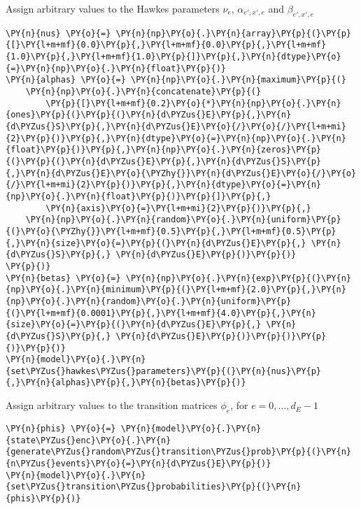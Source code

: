 \documentclass[10pt, article,table]{article}
\begin{document}
    Assign arbitrary values to the Hawkes parameters \(\nu_{e}\),
\(\alpha_{e',x',e}\) and \(\beta_{e',x',e}\)
\begin{tcolorbox}[breakable, size=fbox, boxrule=1pt, pad at break*=1mm,colback=cellbackground, colframe=cellborder]
\begin{Verbatim}[commandchars=\\\{\}]
\PY{n}{nus} \PY{o}{=} \PY{n}{np}\PY{o}{.}\PY{n}{array}\PY{p}{(}\PY{p}{[}\PY{l+m+mf}{0.0}\PY{p}{,}\PY{l+m+mf}{0.0}\PY{p}{,}\PY{l+m+mf}{1.0}\PY{p}{,}\PY{l+m+mf}{1.0}\PY{p}{]}\PY{p}{,}\PY{n}{dtype}\PY{o}{=}\PY{n}{np}\PY{o}{.}\PY{n}{float}\PY{p}{)}
\PY{n}{alphas} \PY{o}{=} \PY{n}{np}\PY{o}{.}\PY{n}{maximum}\PY{p}{(}
    \PY{n}{np}\PY{o}{.}\PY{n}{concatenate}\PY{p}{(}
        \PY{p}{[}\PY{l+m+mf}{0.2}\PY{o}{*}\PY{n}{np}\PY{o}{.}\PY{n}{ones}\PY{p}{(}\PY{p}{(}\PY{n}{d\PYZus{}E}\PY{p}{,}\PY{n}{d\PYZus{}S}\PY{p}{,}\PY{n}{d\PYZus{}E}\PY{o}{/}\PY{o}{/}\PY{l+m+mi}{2}\PY{p}{)}\PY{p}{,}\PY{n}{dtype}\PY{o}{=}\PY{n}{np}\PY{o}{.}\PY{n}{float}\PY{p}{)}\PY{p}{,}\PY{n}{np}\PY{o}{.}\PY{n}{zeros}\PY{p}{(}\PY{p}{(}\PY{n}{d\PYZus{}E}\PY{p}{,}\PY{n}{d\PYZus{}S}\PY{p}{,}\PY{n}{d\PYZus{}E}\PY{o}{\PYZhy{}}\PY{n}{d\PYZus{}E}\PY{o}{/}\PY{o}{/}\PY{l+m+mi}{2}\PY{p}{)}\PY{p}{,}\PY{n}{dtype}\PY{o}{=}\PY{n}{np}\PY{o}{.}\PY{n}{float}\PY{p}{)}\PY{p}{]}\PY{p}{,}
        \PY{n}{axis}\PY{o}{=}\PY{l+m+mi}{2}\PY{p}{)}\PY{p}{,}
    \PY{n}{np}\PY{o}{.}\PY{n}{random}\PY{o}{.}\PY{n}{uniform}\PY{p}{(}\PY{o}{\PYZhy{}}\PY{l+m+mf}{0.5}\PY{p}{,}\PY{l+m+mf}{0.5}\PY{p}{,}\PY{n}{size}\PY{o}{=}\PY{p}{(}\PY{n}{d\PYZus{}E}\PY{p}{,} \PY{n}{d\PYZus{}S}\PY{p}{,} \PY{n}{d\PYZus{}E}\PY{p}{)}\PY{p}{)}
\PY{p}{)}
\PY{n}{betas} \PY{o}{=} \PY{n}{np}\PY{o}{.}\PY{n}{exp}\PY{p}{(}\PY{n}{np}\PY{o}{.}\PY{n}{minimum}\PY{p}{(}\PY{l+m+mf}{2.0}\PY{p}{,}\PY{n}{np}\PY{o}{.}\PY{n}{random}\PY{o}{.}\PY{n}{uniform}\PY{p}{(}\PY{l+m+mf}{0.0001}\PY{p}{,}\PY{l+m+mf}{4.0}\PY{p}{,}\PY{n}{size}\PY{o}{=}\PY{p}{(}\PY{n}{d\PYZus{}E}\PY{p}{,} \PY{n}{d\PYZus{}S}\PY{p}{,} \PY{n}{d\PYZus{}E}\PY{p}{)}\PY{p}{)}\PY{p}{)}\PY{p}{)}
\PY{n}{model}\PY{o}{.}\PY{n}{set\PYZus{}hawkes\PYZus{}parameters}\PY{p}{(}\PY{n}{nus}\PY{p}{,}\PY{n}{alphas}\PY{p}{,}\PY{n}{betas}\PY{p}{)}
\end{Verbatim}
\end{tcolorbox}

    Assign arbitrary values to the transition matrices \(\phi_{e}\), for
\(e=0,\dots,d_E -1\)
\begin{tcolorbox}[breakable, size=fbox, boxrule=1pt, pad at break*=1mm,colback=cellbackground, colframe=cellborder]
\begin{Verbatim}[commandchars=\\\{\}]
\PY{n}{phis} \PY{o}{=} \PY{n}{model}\PY{o}{.}\PY{n}{state\PYZus{}enc}\PY{o}{.}\PY{n}{generate\PYZus{}random\PYZus{}transition\PYZus{}prob}\PY{p}{(}\PY{n}{n\PYZus{}events}\PY{o}{=}\PY{n}{d\PYZus{}E}\PY{p}{)}
\PY{n}{model}\PY{o}{.}\PY{n}{set\PYZus{}transition\PYZus{}probabilities}\PY{p}{(}\PY{n}{phis}\PY{p}{)}
\end{Verbatim}
\end{tcolorbox}
\end{document}
